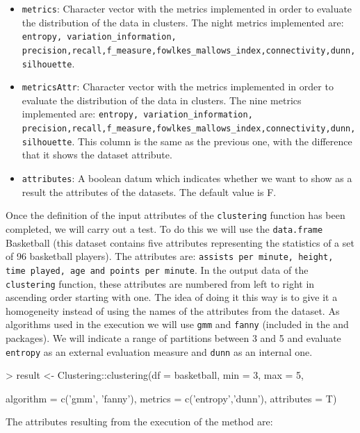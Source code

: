\theendnotes
\begin{itemize}
  \item \texttt{metrics}: Character vector with the metrics implemented in order to evaluate the distribution of the data in clusters. The night metrics implemented are: \texttt{entropy, variation\_information, precision,recall,f\_measure,fowlkes\_mallows\_index,connectivity,dunn,silhouette}.
  \item \texttt{metricsAttr}: Character vector with the metrics implemented in order to evaluate the distribution of the data in clusters. The nine metrics implemented are: \texttt{entropy, variation\_information, precision,recall,f\_measure,fowlkes\_mallows\_index,connectivity,dunn,silhouette}. This column is the same as the previous one, with the difference that it shows the dataset attribute.
  \item \texttt{attributes}: A boolean datum which indicates whether we want to show as a result the attributes of the datasets. The default value is F.
\end{itemize}
Once the definition of the input attributes of the \texttt{clustering} function has been completed, we will carry out a test. To do this we will use the \texttt{data.frame} Basketball (this dataset contains five attributes representing the statistics of a set of 96 basketball players). The attributes are: \texttt{assists per minute, height, time played, age and points per minute}. In the output data of the \texttt{clustering} function, these attributes are numbered from left to right in ascending order starting with one. The idea of doing it this way is to give it a homogeneity instead of using the names of the attributes from the dataset. As algorithms used in the execution we will use \texttt{gmm} and \texttt{fanny} (included in the  and  packages). We will indicate a range of partitions between 3 and 5 and evaluate \texttt{entropy} as an external evaluation measure and \texttt{dunn} as an internal one.

\begin{Schunk}
\begin{Sinput}
> result <- Clustering::clustering(df = basketball, min = 3, max = 5,
\end{Sinput}
\begin{Sinput}
      algorithm = c('gmm', 'fanny'), metrics = c('entropy','dunn'), attributes = T)
\end{Sinput}
\end{Schunk}
The attributes resulting from the execution of the method are:

